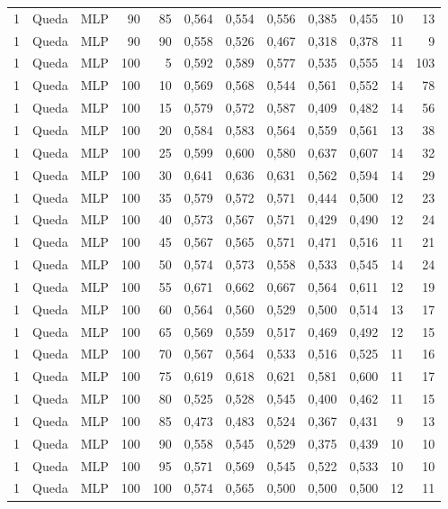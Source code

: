 \begin{longtable}{@{}rllrrrrrrrrr@{}}
1 & Queda & MLP & 90 & 85 & 0,564 & 0,554 & 0,556 & 0,385 & 0,455 & 10 & 13 \\
1 & Queda & MLP & 90 & 90 & 0,558 & 0,526 & 0,467 & 0,318 & 0,378 & 11 & 9 \\
1 & Queda & MLP & 100 & 5 & 0,592 & 0,589 & 0,577 & 0,535 & 0,555 & 14 & 103 \\
1 & Queda & MLP & 100 & 10 & 0,569 & 0,568 & 0,544 & 0,561 & 0,552 & 14 & 78 \\
1 & Queda & MLP & 100 & 15 & 0,579 & 0,572 & 0,587 & 0,409 & 0,482 & 14 & 56 \\
1 & Queda & MLP & 100 & 20 & 0,584 & 0,583 & 0,564 & 0,559 & 0,561 & 13 & 38 \\
1 & Queda & MLP & 100 & 25 & 0,599 & 0,600 & 0,580 & 0,637 & 0,607 & 14 & 32 \\
1 & Queda & MLP & 100 & 30 & 0,641 & 0,636 & 0,631 & 0,562 & 0,594 & 14 & 29 \\
1 & Queda & MLP & 100 & 35 & 0,579 & 0,572 & 0,571 & 0,444 & 0,500 & 12 & 23 \\
1 & Queda & MLP & 100 & 40 & 0,573 & 0,567 & 0,571 & 0,429 & 0,490 & 12 & 24 \\
1 & Queda & MLP & 100 & 45 & 0,567 & 0,565 & 0,571 & 0,471 & 0,516 & 11 & 21 \\
1 & Queda & MLP & 100 & 50 & 0,574 & 0,573 & 0,558 & 0,533 & 0,545 & 14 & 24 \\
1 & Queda & MLP & 100 & 55 & 0,671 & 0,662 & 0,667 & 0,564 & 0,611 & 12 & 19 \\
1 & Queda & MLP & 100 & 60 & 0,564 & 0,560 & 0,529 & 0,500 & 0,514 & 13 & 17 \\
1 & Queda & MLP & 100 & 65 & 0,569 & 0,559 & 0,517 & 0,469 & 0,492 & 12 & 15 \\
1 & Queda & MLP & 100 & 70 & 0,567 & 0,564 & 0,533 & 0,516 & 0,525 & 11 & 16 \\
1 & Queda & MLP & 100 & 75 & 0,619 & 0,618 & 0,621 & 0,581 & 0,600 & 11 & 17 \\
1 & Queda & MLP & 100 & 80 & 0,525 & 0,528 & 0,545 & 0,400 & 0,462 & 11 & 15 \\
1 & Queda & MLP & 100 & 85 & 0,473 & 0,483 & 0,524 & 0,367 & 0,431 & 9 & 13 \\
1 & Queda & MLP & 100 & 90 & 0,558 & 0,545 & 0,529 & 0,375 & 0,439 & 10 & 10 \\
1 & Queda & MLP & 100 & 95 & 0,571 & 0,569 & 0,545 & 0,522 & 0,533 & 10 & 10 \\
1 & Queda & MLP & 100 & 100 & 0,574 & 0,565 & 0,500 & 0,500 & 0,500 & 12 & 11 \\

\end{longtable}

